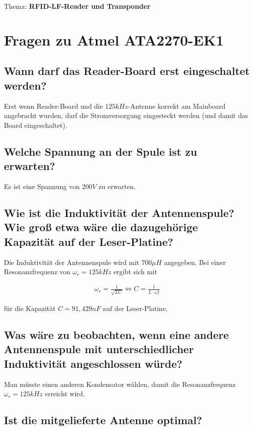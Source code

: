 \documentclass[paper=a4,fontsize=11pt,headsepline,footsepline,parskip=half]{scrartcl}
\begin{document}
\begin{titlepage}
\noindent
\large{Thema: \textbf{RFID-LF-Reader und Transponder}}

\section{Fragen zu Atmel ATA2270-EK1}

\subsection{Wann darf das Reader-Board erst eingeschaltet werden?}

Erst wenn Reader-Board und die $125 kHz$-Antenne korrekt am Mainboard angebracht wurden, darf die Stromversorgung eingesteckt werden (und damit das Board eingeschaltet).

\subsection{Welche Spannung an der Spule ist zu erwarten?}

Es ist eine Spannung von $200 V$ zu erwarten.

\subsection{Wie ist die Induktivität der Antennenspule? Wie groß etwa wäre die dazugehörige Kapazität auf der Leser-Platine?}

Die Induktivität der Antennenspule wird mit $700 \mu H$ angegeben. Bei einer Resonanzfrequenz von $\omega_r = 125 kHz$ ergibt sich mit

\end{titlepage}

\begin{align}
 \omega_r = \frac{1}{\sqrt{LC}} \Leftrightarrow C = \frac{1}{L \cdot \omega_r^2}
\end{align}

für die Kapazität $C = 91,429 nF$ auf der Leser-Platine.

\subsection{Was wäre zu beobachten, wenn eine andere Antennenspule mit unterschiedlicher Induktivität angeschlossen würde?}

Man müsste einen anderen Kondensator wählen, damit die Resonanzfrequenz $\omega_r = 125 kHz$ erreicht wird.

\subsection{Ist die mitgelieferte Antenne optimal?}
\end{document}

